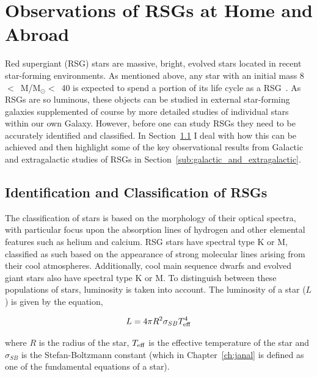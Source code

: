 
\section{Observations of RSGs at Home and Abroad} %
\label{sec:rsg_observations}

Red supergiant (RSG) stars are massive, bright, evolved stars located in recent star-forming environments.
As mentioned above, any star with an initial mass 8~$<$~M/M$_{\odot}<$~40 is expected to spend a portion of its life cycle as a RSG~\citep{2000A&A...361..101M,Massey03, 2007ARA&A..45..177C, Meynet11}.
As RSGs are so luminous, these objects can be studied in external star-forming galaxies supplemented of course by more detailed studies of individual stars within our own Galaxy.
However, before one can study RSGs they need to be accurately identified and classified. In Section~\ref{sub:selection_of_rsgs} I deal with how this can be achieved and then highlight some of the key observational results from Galactic and extragalactic studies of RSGs in Section~\ref{sub:galactic_and_extragalactic}.

\subsection{Identification and Classification of RSGs} %
\label{sub:selection_of_rsgs}

The classification of stars is based on the morphology of their optical spectra, with particular focus upon the absorption lines of hydrogen and other elemental features such as helium and calcium.
RSG stars have spectral type K or M, classified as such based on the appearance of strong molecular lines arising from their cool atmospheres.
Additionally, cool main sequence dwarfs and evolved giant stars also have spectral type K or M.
To distinguish between these populations of stars, luminosity is taken into account.
The luminosity of a star ($L$) is given by the equation,

\begin{equation}
    L = 4\pi R^2\sigma_{SB}T_{\rm eff}^4
\end{equation}

\noindent where $R$ is the radius of the star, $T_{\rm eff}$ is the effective temperature of the star and $\sigma_{SB}$ is the Stefan-Boltzmann constant (which in Chapter~\ref{ch:janal} is defined as one of the fundamental equations of a star).

